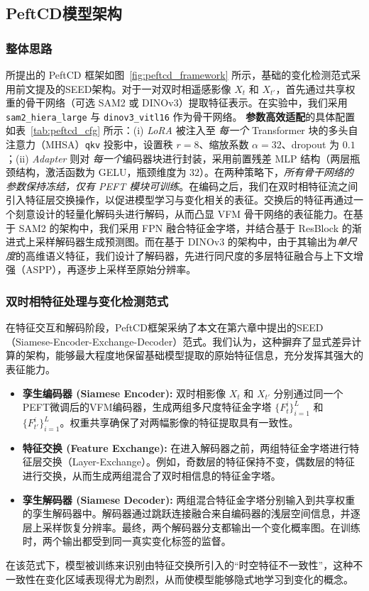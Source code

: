 \subsection{PeftCD模型架构}

\subsubsection{整体思路}

所提出的 PeftCD 框架如图~\ref{fig:peftcd_framework} 所示，基础的变化检测范式采用前文提及的SEED架构。对于一对双时相遥感影像 $X_t$ 和 $X_{t'}$，首先通过共享权重的骨干网络（可选 SAM2 或 DINOv3）提取特征表示。在实验中，我们采用 \texttt{sam2\_hiera\_large} 与 \texttt{dinov3\_vitl16} 作为骨干网络。  
\textbf{参数高效适配}的具体配置如表~\ref{tab:peftcd_cfg} 所示：(i) \emph{LoRA} 被注入至 \emph{每一个} Transformer 块的多头自注意力（MHSA）\texttt{qkv} 投影中，设置秩 $r{=}8$、缩放系数 $\alpha{=}32$、dropout 为 $0.1$；(ii) \emph{Adapter} 则对 \emph{每一个}编码器块进行封装，采用前置残差 MLP 结构（两层瓶颈结构，激活函数为 GELU，瓶颈维度为 $32$）。在两种策略下，\emph{所有骨干网络的参数保持冻结，仅有 PEFT 模块可训练}。在编码之后，我们在双时相特征流之间引入特征层交换操作，以促进模型学习与变化相关的表征。交换后的特征再通过一个刻意设计的轻量化解码头进行解码，从而凸显 VFM 骨干网络的表征能力。在基于 SAM2 的架构中，我们采用 FPN 融合特征金字塔，并结合基于 ResBlock 的渐进式上采样解码器生成预测图。而在基于 DINOv3 的架构中，由于其输出为\emph{单尺度}的高维语义特征，我们设计了解码器，先进行同尺度的多层特征融合与上下文增强（ASPP），再逐步上采样至原始分辨率。

\subsubsection{双时相特征处理与变化检测范式}
在特征交互和解码阶段，PeftCD框架采纳了本文在第六章中提出的SEED（Siamese-Encoder-Exchange-Decoder）范式。我们认为，这种摒弃了显式差异计算的架构，能够最大程度地保留基础模型提取的原始特征信息，充分发挥其强大的表征能力。
\begin{itemize}
    \item \textbf{孪生编码器 (Siamese Encoder):} 双时相影像 $X_t$ 和 $X_{t'}$ 分别通过同一个PEFT微调后的VFM编码器，生成两组多尺度特征金字塔 $\{F_t^i\}_{i=1}^L$ 和 $\{F_{t'}^i\}_{i=1}^L$。权重共享确保了对两幅影像的特征提取具有一致性。
    \item \textbf{特征交换 (Feature Exchange):} 在进入解码器之前，两组特征金字塔进行特征层交换（Layer-Exchange）。例如，奇数层的特征保持不变，偶数层的特征进行交换，从而生成两组混合了双时相信息的特征金字塔。
    \item \textbf{孪生解码器 (Siamese Decoder):} 两组混合特征金字塔分别输入到共享权重的孪生解码器中。解码器通过跳跃连接融合来自编码器的浅层空间信息，并逐层上采样恢复分辨率。最终，两个解码器分支都输出一个变化概率图。在训练时，两个输出都受到同一真实变化标签的监督。
\end{itemize}
在该范式下，模型被训练来识别由特征交换所引入的“时空特征不一致性”，这种不一致性在变化区域表现得尤为剧烈，从而使模型能够隐式地学习到变化的概念。

